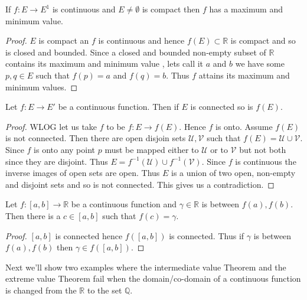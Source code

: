 \begin{Corollary}[name=Extreme Value Theorem]
    If $f : E \to E^1$ is continuous and $E \neq \emptyset$ is compact then $f$ has a maximum and 
    minimum value. 
\end{Corollary}
\begin{proof}
    $E$ is compact an $f$ is continuous and hence $f(E) \subset \mathbb{R}$ is compact and so is
    closed and bounded. Since a closed and bounded non-empty subset of $\mathbb{R}$ contains its 
    maximum and minimum value , lets call it $a$ and $b$ we have some $p,q \in E$ such that $f(p) =
    a$ and $f(q) = b$. Thus $f$ attains its maximum and minimum values.
\end{proof}

\begin{Theorem}[name=Continuous functions in connected sets]
    Let $f : E \to E'$ be a continuous function. Then if $E$ is connected so is $f(E)$.
\end{Theorem}
\begin{proof}
    WLOG let us take $f$ to be $f : E \to f(E)$. Hence $f$ is onto. Assume $f(E)$ is not connected.
    Then there are open disjoin sets $\mathcal{U},\mathcal{V}$ such that $f(E) = \mathcal{U} \cup
    \mathcal{V}$. Since $f$ is onto any point $p$ must be mapped either to $\mathcal{U}$ or to
    $\mathcal{V}$ but not both since they are disjoint. Thus $E = f^{-1}(\mathcal{U}) \cup
    f^{-1}(\mathcal{V})$. Since $f$ is continuous the inverse images of open sets are open. Thus $E$
    is a union of two open, non-empty and disjoint sets and so is not connected. This gives us a
    contradiction.
\end{proof}
\begin{Corollary}[name= Intermediate value Theorem]
    Let $f : \left[a,b\right] \to \mathbb{R}$ be a continuous function and $\gamma \in \mathbb{R}$ is
    between $f(a),f(b)$. Then there is a $c \in \left[a,b\right]$ such that $f(c) = \gamma$.
     
\end{Corollary}
\begin{proof}
    $\left[a,b\right]$ is connected hence $f(\left[a,b\right])$ is connected. Thus if $\gamma$ is
    between $f(a),f(b)$ then $\gamma \in f(\left[a,b\right])$. 
\end{proof}
Next we'll show two examples where the intermediate value Theorem and the extreme value Theorem fail
when the domain/co-domain of a continuous function is changed from the $\mathbb{R}$ to the set
$\mathbb{Q}$. 
